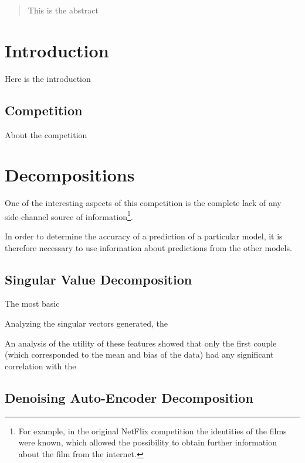 \documentclass{article}
\begin{document}
 


\begin{abstract} 
This is the abstract
\end{abstract} 

\section{Introduction}

Here is the introduction

\subsection{Competition}

About the competition

\section{Decompositions}

One of the interesting aspects of this competition is the complete lack of any
side-channel source of information\footnote{For example, in the original NetFlix
competition the identities of the films were known, which allowed the
possibility to obtain further information about the film from the internet.}.

In order to determine the accuracy of a prediction of a particular model, it is
therefore necessary to use information about predictions from the other models.

\subsection{Singular Value Decomposition}

The most basic

Analyzing the singular vectors generated, the 


An analysis of the utility of these features showed that only the first couple
(which corresponded to the mean and bias of the data) had any significant
correlation with the 

\subsection{Denoising Auto-Encoder Decomposition}
\end{document}

